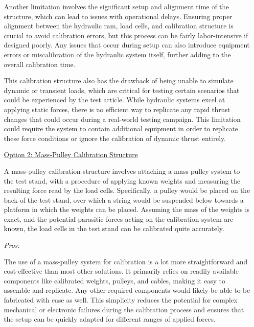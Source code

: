 Another limitation involves the significant setup and alignment time of the structure, which can lead to issues with operational delays. Ensuring proper alignment between the hydraulic ram, load cells, and calibration structure is crucial to avoid calibration errors, but this process can be fairly labor-intensive if designed poorly. Any issues that occur during setup can also introduce equipment errors or miscalibration of the hydraulic system itself, further adding to the overall calibration time.

This calibration structure also has the drawback of being unable to simulate dynamic or transient loads, which are critical for testing certain scenarios that could be experienced by the test article. While hydraulic systems excel at applying static forces, there is no efficient way to replicate any rapid thrust changes that could occur during a real-world testing campaign. This limitation could require the system to contain additional equipment in order to replicate these force conditions or ignore the calibration of dynamic thrust entirely.

\noindent\underline{Option 2: Mass-Pulley Calibration Structure}

A mass-pulley calibration structure involves attaching a mass pulley system to the test stand, with a procedure of applying known weights and measuring the resulting force read by the load cells. Specifically, a pulley would be placed on the back of the test stand, over which a string would be suspended below towards a platform in which the weights can be placed. Assuming the mass of the weights is exact, and the potential parasitic forces acting on the calibration system are known, the load cells in the test stand can be calibrated quite accurately.

\begin{figure}
    \centering
    \hspace{3em}
    \caption{}
    \label{fig:mass-pulley-calibration-example}
\end{figure}

\noindent\textit{Pros:}

The use of a mass-pulley system for calibration is a lot more straightforward and cost-effective than most other solutions. It primarily relies on readily available components like calibrated weights, pulleys, and cables, making it easy to assemble and replicate. Any other required components would likely be able to be fabricated with ease as well. This simplicity reduces the potential for complex mechanical or electronic failures during the calibration process and ensures that the setup can be quickly adapted for different ranges of applied forces.

